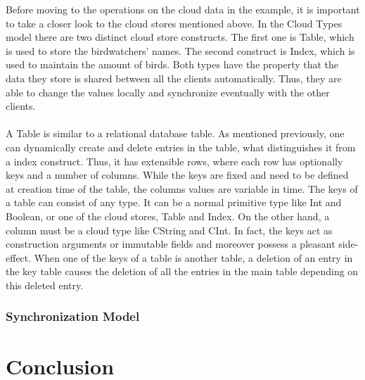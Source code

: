 \documentclass[a4paper,12pt]{report}
\begin{document}
Before moving to the operations on the cloud data in the example, it is important to take a closer look to the cloud stores mentioned above. In the Cloud Types model there are two distinct cloud store constructs. The first one is \textcolor{codedarkblue}{Table}, which is used to store the birdwatchers' names. The second construct is \textcolor{codedarkblue}{Index}, which is used to maintain the amount of birds. Both types have the property that the data they store is shared between all the clients automatically. Thus, they are able to change the values locally and synchronize eventually with the other clients. \\ 
\\
A \textcolor{codeblue}{Table} is similar to a relational database table. As mentioned previously, one can dynamically create and delete entries in the table, what distinguishes it from a index construct. Thus, it has extensible rows, where each row has optionally keys and a number of columns. While the keys are fixed and need to be defined at creation time of the table, the columns values are variable in time. The keys of a table can consist of any type. It can be a normal primitive type like \textcolor{codedarkblue}{Int} and \textcolor{codedarkblue}{Boolean}, or one of the cloud stores, \textcolor{codeblue}{Table} and \textcolor{codeblue}{Index}. On the other hand, a column must be a cloud type like \textcolor{codedarkblue}{CString} and \textcolor{codedarkblue}{CInt}. In fact, the keys act as construction arguments or immutable fields and moreover possess a pleasant side-effect. When one of the keys of a table is another table, a deletion of an entry in the key table causes the deletion of all the entries in the main table depending on this deleted entry. 
\\



\subsection{Synchronization Model}\label{subsec:SynchronizationModel}

\chapter{Conclusion}\label{cha:Conclusion} %
\end{document}
